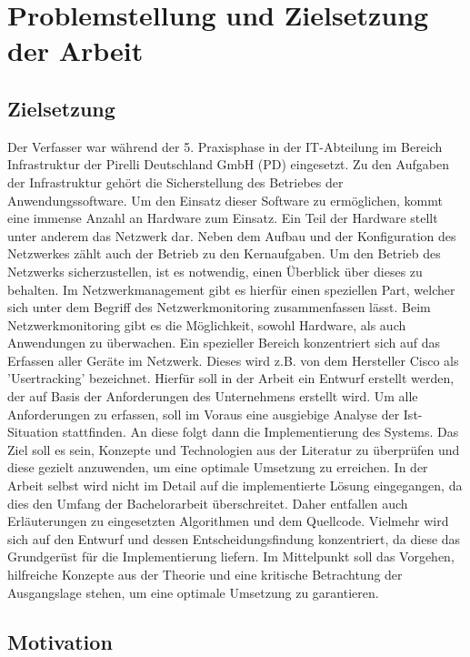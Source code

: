 \chapter{Problemstellung und Zielsetzung der Arbeit}
\label{cha:Einleitung}

\section{Zielsetzung}

Der Verfasser war während der 5. Praxisphase in der IT-Abteilung im Bereich Infrastruktur der Pirelli Deutschland GmbH (PD) eingesetzt.
Zu den Aufgaben der Infrastruktur gehört die Sicherstellung des Betriebes der Anwendungssoftware.
Um den Einsatz dieser Software zu ermöglichen, kommt eine immense Anzahl an Hardware zum Einsatz.
Ein Teil der Hardware stellt unter anderem das Netzwerk dar.
Neben dem Aufbau und der Konfiguration des Netzwerkes zählt auch der Betrieb zu den Kernaufgaben.
Um den Betrieb des Netzwerks sicherzustellen, ist es notwendig, einen Überblick über dieses zu behalten.
Im Netzwerkmanagement gibt es hierfür einen speziellen Part, welcher sich unter dem Begriff des Netzwerkmonitoring zusammenfassen lässt.
Beim Netzwerkmonitoring gibt es die Möglichkeit, sowohl Hardware, als auch Anwendungen zu überwachen.
Ein spezieller Bereich konzentriert sich auf das Erfassen aller Geräte im Netzwerk.
Dieses wird z.B. von dem Hersteller Cisco als 'Usertracking' bezeichnet.
Hierfür soll in der Arbeit ein Entwurf erstellt werden, der auf Basis der Anforderungen des Unternehmens erstellt wird.
Um alle Anforderungen zu erfassen, soll im Voraus eine ausgiebige Analyse der Ist-Situation stattfinden.
An diese folgt dann die Implementierung des Systems.
Das Ziel soll es sein, Konzepte und Technologien aus der Literatur zu überprüfen und diese gezielt anzuwenden, um eine optimale Umsetzung zu erreichen. 
In der Arbeit selbst wird nicht im Detail auf die implementierte Lösung eingegangen, da dies den Umfang der Bachelorarbeit überschreitet.
Daher entfallen auch Erläuterungen zu eingesetzten Algorithmen und dem Quellcode.
Vielmehr wird sich auf den Entwurf und dessen Entscheidungsfindung konzentriert, da diese das Grundgerüst für die Implementierung liefern.
Im Mittelpunkt soll das Vorgehen, hilfreiche Konzepte aus der Theorie und eine kritische Betrachtung der Ausgangslage stehen, um eine optimale Umsetzung zu garantieren.\\


\section{Motivation}

